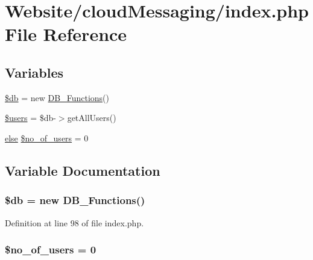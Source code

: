 \hypertarget{cloud_messaging_2index_8php}{\section{Website/cloud\-Messaging/index.php File Reference}
\label{cloud_messaging_2index_8php}
}
\subsection*{Variables}
\begin{DoxyCompactItemize}
\item 
\hyperlink{cloud_messaging_2index_8php_a1fa3127fc82f96b1436d871ef02be319}{\$db} = new \hyperlink{class_d_b___functions}{D\-B\-\_\-\-Functions}()
\item 
\hyperlink{cloud_messaging_2index_8php_a28005d22fa7ef2dfe215ad886b497d9c}{\$users} = \$db-\/$>$get\-All\-Users()
\item 
\hyperlink{_p_h_p_validate_login_8php_ab6024c486eebf5823d5a9fddf2cbde2d}{else} \hyperlink{cloud_messaging_2index_8php_a70b0c3f8d2a63edbb698f5e3daf0bf54}{\$no\-\_\-of\-\_\-users} = 0
\end{DoxyCompactItemize}


\subsection{Variable Documentation}
\hypertarget{cloud_messaging_2index_8php_a1fa3127fc82f96b1436d871ef02be319}{
\subsubsection[{\$db}]{\setlength{\rightskip}{0pt plus 5cm}\$db = new {\bf D\-B\-\_\-\-Functions}()}}\label{cloud_messaging_2index_8php_a1fa3127fc82f96b1436d871ef02be319}


Definition at line 98 of file index.\-php.

\hypertarget{cloud_messaging_2index_8php_a70b0c3f8d2a63edbb698f5e3daf0bf54}{
\subsubsection[{\$no\-\_\-of\-\_\-users}]{ \$no\-\_\-of\-\_\-users = 0}}\label{cloud_messaging_2index_8php_a70b0c3f8d2a63edbb698f5e3daf0bf54}


